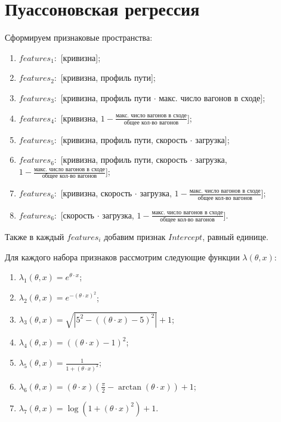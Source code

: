 \section{Пуассоновская регрессия}

Сформируем признаковые пространства:
\begin{enumerate}[label=\arabic*.]
    \item $features_1:$ [кривизна];
    \item $features_2:$ [кривизна, профиль пути];
    \item $features_3:$ [кривизна, профиль пути $\cdot$ макс. число вагонов в сходе];
    \item $features_4:$ [кривизна, $1 - \frac{\text{макс. число вагонов в сходе}}{\text{общее кол-во вагонов}}$];
    \item $features_5:$ [кривизна, профиль пути, скорость $\cdot$ загрузка];
    \item $features_6:$ [кривизна, профиль пути, скорость $\cdot$ загрузка,\\ $1 - \frac{\text{макс. число вагонов в сходе}}{\text{общее кол-во вагонов}}$];
    \item $features_6:$ [кривизна, скорость $\cdot$ загрузка, $1 - \frac{\text{макс. число вагонов в сходе}}{\text{общее кол-во вагонов}}$];
    \item $features_6:$ [скорость $\cdot$ загрузка, $1 - \frac{\text{макс. число вагонов в сходе}}{\text{общее кол-во вагонов}}$].
    \newline
\end{enumerate}
Также в каждый $features_i$ добавим признак $Intercept$, равный единице.

Для каждого набора признаков рассмотрим следующие функции $\lambda(\theta, x)$:
\begin{enumerate}[label=\arabic*.]
    \item $\lambda_1(\theta, x) = e^{\theta \cdot x}$;
    \item $\lambda_2(\theta, x) = e^{-(\theta \cdot x)^2}$;
    \item $\lambda_3(\theta, x) = \sqrt{|5^2 - ((\theta \cdot x) - 5)^2|} + 1$;
    \item $\lambda_4(\theta, x) = ((\theta \cdot x) - 1)^2$;
    \item $\lambda_5(\theta, x) = \frac{1}{1 + (\theta \cdot x)^2}$;
    \item $\lambda_6(\theta, x) = (\theta \cdot x) (\frac{\pi}{2} - \arctan(\theta \cdot x)) + 1$;
    \item $\lambda_7(\theta, x) = \log(1 + (\theta \cdot x)^2) + 1$.
\end{enumerate}

